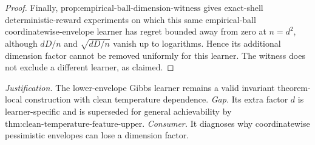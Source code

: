 \documentclass{article}
\begin{document}
\begin{proof}
Finally, \(\text{prop:empirical-ball-dimension-witness}\) gives exact-shell deterministic-reward experiments on which this same empirical-ball coordinatewise-envelope learner has regret bounded away from zero at \(n=d^2\), although \(dD/n\) and \(\sqrt{dD/n}\) vanish up to logarithms. Hence its additional dimension factor cannot be removed uniformly for this learner. The witness does not exclude a different learner, as claimed.
\end{proof}
\par\smallskip\noindent \textit{Justification.} The lower-envelope Gibbs learner remains a valid invariant theorem-local construction with clean temperature dependence. \textit{Gap.} Its extra factor \(d\) is learner-specific and is superseded for general achievability by \(\text{thm:clean-temperature-feature-upper}\). \textit{Consumer.} It diagnoses why coordinatewise pessimistic envelopes can lose a dimension factor.
\end{document}
